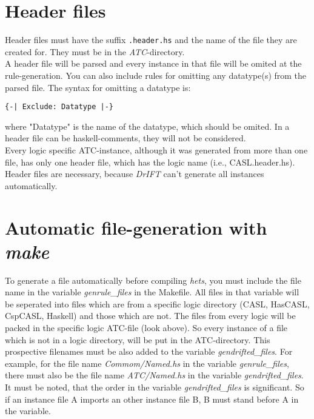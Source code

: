 \documentclass{article}
\begin{document}
\section*{Header files}
Header files must have the suffix \verb|.header.hs| and the name of the file they 
are created for. They must be in the \emph{ATC}-directory.\\
A header file will be parsed and every instance in that file will be omited
at the rule-generation. You can also include rules for omitting any datatype(s) 
from the parsed file. The syntax for omitting a datatype is: 
\begin{verbatim}
{-| Exclude: Datatype |-}
\end{verbatim}
where "Datatype" is the name of the datatype, which should be omited. In a header file can be 
haskell-comments, they will not be considered. \\
Every logic specific ATC-instance, although it was generated from more than one file, has only one 
header file, which has the logic name (i.e., CASL.header.hs).\\
Header files are necessary, because \emph{DrIFT} can't generate all instances automatically.

\section*{Automatic file-generation with \emph{make}}
To generate a file automatically before compiling \emph{hets}, you must include the file name
in the variable \emph{genrule\_files} in the Makefile. All files in that variable will be seperated 
into files which are from a specific logic directory (CASL, HasCASL, CspCASL, Haskell) and those which 
are not. The files from every logic will be packed in the specific logic ATC-file (look above).
So every instance of a file which is not in a logic directory, will be put in the ATC-directory. 
This prospective filenames must be also added to the variable \emph{gendrifted\_files}. For example,
for the file name \emph{Commom/Named.hs} in the variable \emph{genrule\_files}, there must also be 
the file name \emph{ATC/Named.hs} in the variable \emph{gendrifted\_files}.\\
It must be noted, that the order in the variable \emph{gendrifted\_files} is significant. So if 
an instance file A imports an other instance file B, B must stand before A in the variable.
\end{document}
